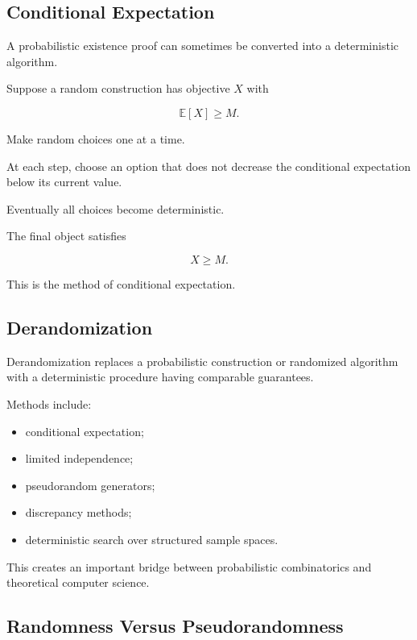 \subsection{Conditional Expectation}
\label{subsec:conditional-expectation-method}

A probabilistic existence proof can sometimes be converted into a
deterministic algorithm.

Suppose a random construction has objective \(X\) with

\[
\mathbb{E}[X]\geq M.
\]

Make random choices one at a time.

At each step, choose an option that does not decrease the conditional
expectation below its current value.

Eventually all choices become deterministic.

The final object satisfies

\[
\boxed{
X\geq M.
}
\]

This is the method of conditional expectation.

\subsection{Derandomization}
\label{subsec:derandomization}

Derandomization replaces a probabilistic construction or randomized
algorithm with a deterministic procedure having comparable guarantees.

Methods include:

\begin{itemize}
    \item conditional expectation;
    \item limited independence;
    \item pseudorandom generators;
    \item discrepancy methods;
    \item deterministic search over structured sample spaces.
\end{itemize}

This creates an important bridge between probabilistic combinatorics and
theoretical computer science.

\subsection{Randomness Versus Pseudorandomness}
\label{subsec:randomness-pseudorandomness}


